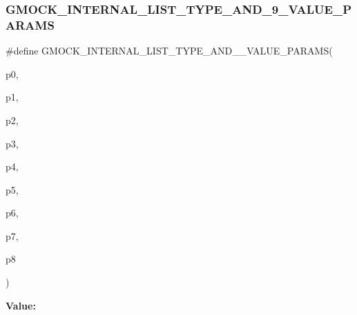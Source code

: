 \subsubsection{\texorpdfstring{GMOCK\_INTERNAL\_LIST\_TYPE\_AND\_9\_VALUE\_PARAMS}{GMOCK\_INTERNAL\_LIST\_TYPE\_AND\_9\_VALUE\_PARAMS}}
{\footnotesize\ttfamily \#define G\+M\+O\+C\+K\+\_\+\+I\+N\+T\+E\+R\+N\+A\+L\+\_\+\+L\+I\+S\+T\+\_\+\+T\+Y\+P\+E\+\_\+\+A\+N\+D\+\_\+\_\+\+V\+A\+L\+U\+E\+\_\+\+P\+A\+R\+A\+MS(\begin{DoxyParamCaption}\item[{}]{p0,  }\item[{}]{p1,  }\item[{}]{p2,  }\item[{}]{p3,  }\item[{}]{p4,  }\item[{}]{p5,  }\item[{}]{p6,  }\item[{}]{p7,  }\item[{}]{p8 }\end{DoxyParamCaption})}

{\bfseries Value\+:}
\begin{DoxyCode}{0}

\end{DoxyCode}
